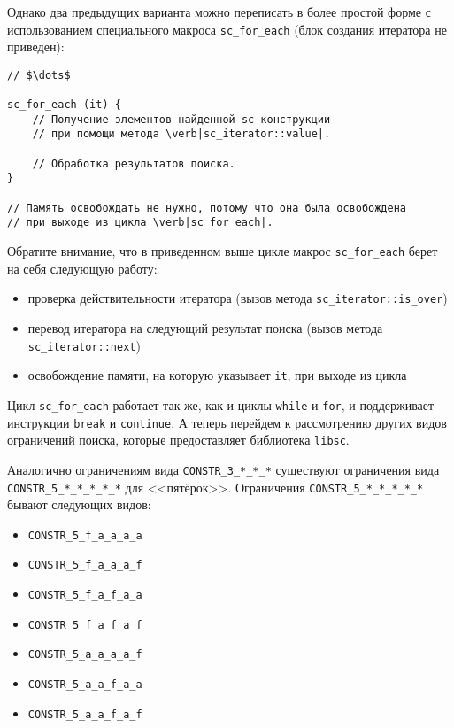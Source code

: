 Однако два предыдущих варианта можно переписать в более простой форме
с использованием специального макроса \lstinline|sc_for_each| (блок
создания итератора не приведен):

\begin{lstlisting}[texcl]
// $\dots$

sc_for_each (it) {
    // Получение элементов найденной sc-конструкции
    // при помощи метода \verb|sc_iterator::value|.

    // Обработка результатов поиска.
}

// Память освобождать не нужно, потому что она была освобождена
// при выходе из цикла \verb|sc_for_each|.
\end{lstlisting}

Обратите внимание, что в приведенном выше цикле макрос
\lstinline|sc_for_each| берет на себя следующую работу:

\begin{itemize}
\item проверка действительности итератора (вызов метода
  \lstinline|sc_iterator::is_over|)
\item перевод итератора на следующий результат поиска (вызов метода
  \lstinline|sc_iterator::next|)
\item освобождение памяти, на которую указывает \lstinline|it|, при
  выходе из цикла
\end{itemize}

Цикл \lstinline|sc_for_each| работает так же, как и циклы
\lstinline|while| и \lstinline|for|, и поддерживает инструкции
\lstinline|break| и \lstinline|continue|.  А теперь перейдем к
рассмотрению других видов ограничений поиска, которые предоставляет
библиотека \texttt{libsc}.

Аналогично ограничениям вида \verb|CONSTR_3_*_*_*| существуют
ограничения вида \verb|CONSTR_5_*_*_*_*_*| для
<<пятёрок>>. Ограничения \verb|CONSTR_5_*_*_*_*_*| бывают следующих
видов:

\begin{itemize}
\item \lstinline|CONSTR_5_f_a_a_a_a|
\item \lstinline|CONSTR_5_f_a_a_a_f|
\item \lstinline|CONSTR_5_f_a_f_a_a|
\item \lstinline|CONSTR_5_f_a_f_a_f|
\item \lstinline|CONSTR_5_a_a_a_a_f|
\item \lstinline|CONSTR_5_a_a_f_a_a|
\item \lstinline|CONSTR_5_a_a_f_a_f|
\end{itemize}

